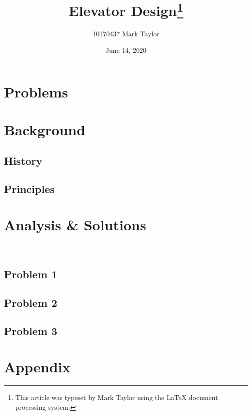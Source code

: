 \documentclass{article}
\begin{document}
	
	
	\title{Elevator Design\footnote{
			This article was typeset by Mark Taylor using 
	the \protect\LaTeX{}
			document processing system. }}
	
	\author{10170437 Mark Taylor}
	
	\date{June 14, 2020}
	
	\maketitle
		
	\hypertarget{Contents}{}  %
	\tableofcontents
	
	
	\section{Problems}	
	
    
    \section{Background}
    \subsection{History}   
       

 	\subsection{Principles}
 	
 	
	\section{Analysis \& Solutions}	
	🔑 🔑 🔑 
	\subsection{Problem 1}
		
	
	\subsection{Problem 2}
	
	
	\subsection{Problem 3}
	
		
%			

	\section{Appendix}
	
	
\end{document}
